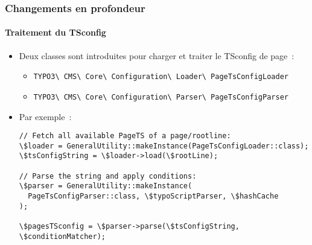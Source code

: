 
\begin{frame}[fragile]
	\frametitle{Changements en profondeur}
	\framesubtitle{Traitement du TSconfig}

	\lstset{basicstyle=\tiny\ttfamily}

	\begin{itemize}
		\item Deux classes sont introduites pour charger et traiter le TSconfig de page~:
			\begin{itemize}\smaller
				\item \texttt{TYPO3\textbackslash
					CMS\textbackslash
					Core\textbackslash
					Configuration\textbackslash
					Loader\textbackslash
					PageTsConfigLoader}
				\item \texttt{TYPO3\textbackslash
					CMS\textbackslash
					Core\textbackslash
					Configuration\textbackslash
					Parser\textbackslash
					PageTsConfigParser}
			\end{itemize}

		\item Par exemple~:
\begin{lstlisting}
// Fetch all available PageTS of a page/rootline:
\$loader = GeneralUtility::makeInstance(PageTsConfigLoader::class);
\$tsConfigString = \$loader->load(\$rootLine);

// Parse the string and apply conditions:
\$parser = GeneralUtility::makeInstance(
  PageTsConfigParser::class, \$typoScriptParser, \$hashCache
);

\$pagesTSconfig = \$parser->parse(\$tsConfigString, \$conditionMatcher);
\end{lstlisting}

	\end{itemize}

\end{frame}


